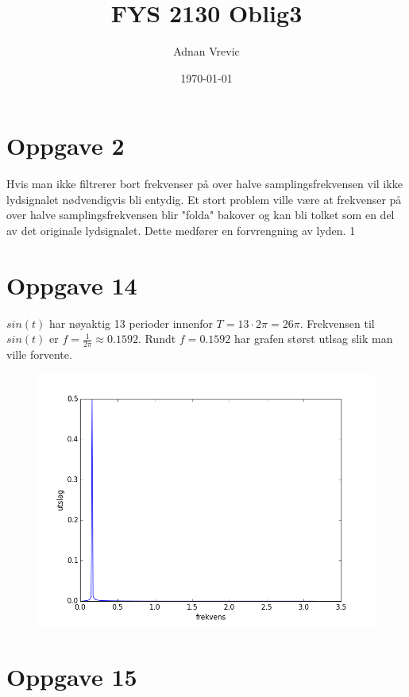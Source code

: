 \documentclass[norsk,a4paper,12pt]{article}
\title{FYS 2130 Oblig3}
\author{Adnan Vrevic}
\date{\today}
\begin{document}
\maketitle


\section*{Oppgave 2}

Hvis man ikke filtrerer bort frekvenser på over halve samplingsfrekvensen vil ikke lydsignalet nødvendigvis bli entydig. Et stort problem ville være at frekvenser på over halve samplingsfrekvensen blir "folda" bakover og kan bli tolket som en del av det originale lydsignalet. Dette medfører en forvrengning av lyden.
1

\section*{Oppgave 14}

$sin(t)$ har nøyaktig 13 perioder innenfor $T=13 \cdot 2\pi = 26 \pi$. Frekvensen til $sin(t)$ er $f = \frac{1}{2\pi}\approx0.1592$. Rundt $f = 0.1592$ har grafen størst utlsag slik man ville forvente.

\begin{figure}[H]
\includegraphics[width=15cm]{oppgave14.png}
\end{figure}

\section*{Oppgave 15}
\end{document}
